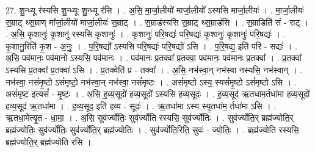 \documentclass[17pt]{extarticle}
\begin{document}
27. शु॒न्ध्यू र॑स्यसि शु॒न्ध्यूः शु॒न्ध्यू र॑सि । . अ॒सि॒ मा॒र्जा॒लीयो॑ मार्जा॒लीयो᳚ ऽस्यसि मार्जा॒लीयः॑ । . मा॒र्जा॒लीयः॑ स॒म्राट् थ्स॒म्राण् मा᳚र्जा॒लीयो॑ मार्जा॒लीयः॑ स॒म्राट् । . स॒म्राड॑स्यसि स॒म्राट् थ्स॒म्राड॑सि । . स॒म्राडिति॑ सं - राट् । . अ॒सि॒ कृ॒शानुः॑ कृ॒शानु॑ रस्यसि कृ॒शानुः॑ । . कृ॒शानुः॑ परि॒षद्यः॑ परि॒षद्यः॑ कृ॒शानुः॑ कृ॒शानुः॑ परि॒षद्यः॑ । . कृ॒शानु॒रिति॑ कृ॒श - अ॒नुः॒ । . प॒रि॒षद्यो᳚ ऽस्यसि परि॒षद्यः॑ परि॒षद्यो॑ ऽसि । . प॒रि॒षद्य॒ इति॑ परि - सद्यः॑ । . अ॒सि॒ पव॑मानः॒ पव॑मानो ऽस्यसि॒ पव॑मानः । . पव॑मानः प्र॒तक्वा᳚ प्र॒तक्वा॒ पव॑मानः॒ पव॑मानः प्र॒तक्वा᳚ । . प्र॒तक्वा᳚ ऽस्यसि प्र॒तक्वा᳚ प्र॒तक्वा॑ ऽसि । . प्र॒तक्वेति॑ प्र - तक्वा᳚ । . अ॒सि॒ नभ॑स्वा॒न् नभ॑स्वा नस्यसि॒ नभ॑स्वान् । . नभ॑स्वा॒ नसं॑मृ॒ष्टो ऽसं॑मृष्टो॒ नभ॑स्वा॒न् नभ॑स्वा॒ नसं॑मृष्टः । . असं॑मृष्टो ऽस्य॒ स्यसं॑मृ॒ष्टो ऽसं॑मृष्टो ऽसि । . असं॑मृष्ट॒ इत्यसं᳚ - मृ॒ष्टः॒ । . अ॒सि॒ ह॒व्य॒सूदो॑ हव्य॒सूदो᳚ ऽस्यसि हव्य॒सूदः॑ । . ह॒व्य॒सूद॑ ऋ॒तधा॑म॒र्तधा॑मा हव्य॒सूदो॑ हव्य॒सूद॑ ऋ॒तधा॑मा । . ह॒व्य॒सूद॒ इति॑ हव्य - सूदः॑ । . ऋ॒तधा॑मा ऽस्य स्यृ॒तधा॑म॒ र्तधा॑मा ऽसि । . ऋ॒तधा॒मेत्यृ॒त - धा॒मा॒ । . अ॒सि॒ सुव॑र्ज्योतिः॒ सुव॑र्ज्योति रस्यसि॒ सुव॑र्ज्योतिः । . सुव॑र्ज्योति॒र् ब्रह्म॑ज्योति॒र् ब्रह्म॑ज्योतिः॒ सुव॑र्ज्योतिः॒ सुव॑र्ज्योति॒र् ब्रह्म॑ज्योतिः । . सुव॑र्ज्योति॒रिति॒ सुवः॑ - ज्यो॒तिः॒ । . ब्रह्म॑ज्योति रस्यसि॒ ब्रह्म॑ज्योति॒र् ब्रह्म॑ज्योति रसि । \newline
\end{document}
